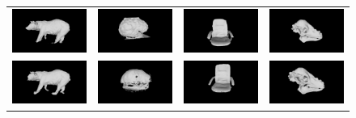 \begin{figure}[!t]
	\centering
	\begin{tabular}{cccc}
		\includegraphics[width=3cm]{screenshots/Comparison Stills/InfiniTAM/bear00.png}&
		\includegraphics[width=3cm]{screenshots/Comparison Stills/InfiniTAM/brain00.png}&
		\includegraphics[width=3cm]{screenshots/Comparison Stills/InfiniTAM/chair00.png}&
		\includegraphics[width=3cm]{screenshots/Comparison Stills/InfiniTAM/dino00.png}\\
		\includegraphics[width=3cm]{screenshots/Comparison Stills/ProbObjects/bear00.png}&
		\includegraphics[width=3cm]{screenshots/Comparison Stills/ProbObjects/brain00.png}&
		\includegraphics[width=3cm]{screenshots/Comparison Stills/ProbObjects/chair00.png}&
		\includegraphics[width=3cm]{screenshots/Comparison Stills/ProbObjects/dino00.png}\\

\end{tabular}
\end{figure}
